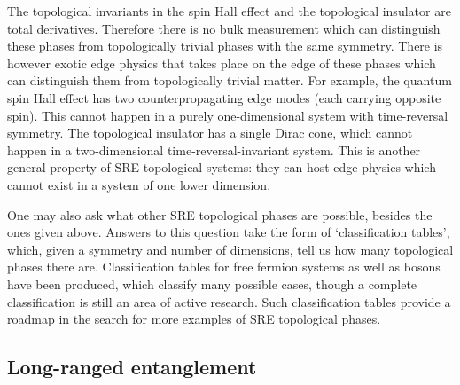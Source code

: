 The topological invariants in the spin Hall effect and the topological insulator are total derivatives. Therefore 
there is no bulk measurement which can distinguish these phases from topologically trivial phases with the same symmetry. There is however exotic edge physics that takes place on the edge of these phases which can distinguish them from topologically trivial matter. For example, the quantum spin Hall effect has two counterpropagating edge modes (each carrying opposite spin). This cannot happen in a purely one-dimensional system with time-reversal symmetry.\cite{NielsenNinomiya} The topological insulator has a single Dirac cone, which cannot happen in a two-dimensional time-reversal-invariant system. This is another general property of SRE topological systems: they can host edge physics which cannot exist in a system of one lower dimension.

One may also ask what other SRE topological phases are possible, besides the ones given above. Answers to this question take the form of `classification tables', which, given a symmetry and number of dimensions, tell us how many topological phases there are. Classification tables for free fermion systems\cite{KitaevClass,Ludwig} as well as bosons\cite{WenScience,WenPRB,KapustinThorngren} have been produced, which classify many possible cases, though a complete classification is still an area of active research. Such classification tables provide a roadmap in the search for more examples of SRE topological phases.

\subsection{Long-ranged entanglement}
\label{subsec::LRE}

